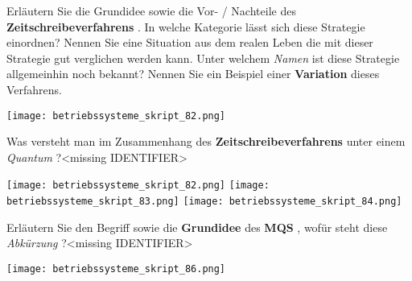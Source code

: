 \documentclass{article}
\begin{document}
\begin{tcolorbox}[colback=white!10!white,colframe=lightgray!75!black,
  savelowerto=\jobname_ex.tex]

\begin{center}
Erläutern Sie die Grundidee sowie die Vor- / Nachteile des 
\textbf{Zeitschreibeverfahrens
}. In welche Kategorie lässt sich diese Strategie einordnen?
Nennen Sie eine Situation aus dem realen Leben die mit dieser Strategie gut verglichen werden kann.
Unter welchem 
\textit{Namen
} ist diese Strategie allgemeinhin noch bekannt?
Nennen Sie ein Beispiel einer 
\textbf{Variation
} dieses Verfahrens.

\end{center}

\tcblower

\justifying
\texttt{[image: betriebssysteme\_skript\_82.png]}

\end{tcolorbox}
\begin{tcolorbox}[colback=white!10!white,colframe=lightgray!75!black,
  savelowerto=\jobname_ex.tex]

\begin{center}
Was versteht man im Zusammenhang des 
\textbf{Zeitschreibeverfahrens
} unter einem 
\textit{Quantum
}?<missing IDENTIFIER>

\end{center}

\tcblower

\justifying
\texttt{[image: betriebssysteme\_skript\_82.png]}
\texttt{[image: betriebssysteme\_skript\_83.png]}
\texttt{[image: betriebssysteme\_skript\_84.png]}

\end{tcolorbox}
\begin{tcolorbox}[colback=white!10!white,colframe=lightgray!75!black,
  savelowerto=\jobname_ex.tex]

\begin{center}
Erläutern Sie den Begriff sowie die 
\textbf{Grundidee
} des 
\textbf{MQS
}, wofür steht diese 
\textit{Abkürzung
}?<missing IDENTIFIER>

\end{center}

\tcblower

\justifying
\texttt{[image: betriebssysteme\_skript\_86.png]}

\end{tcolorbox}
\end{document}
